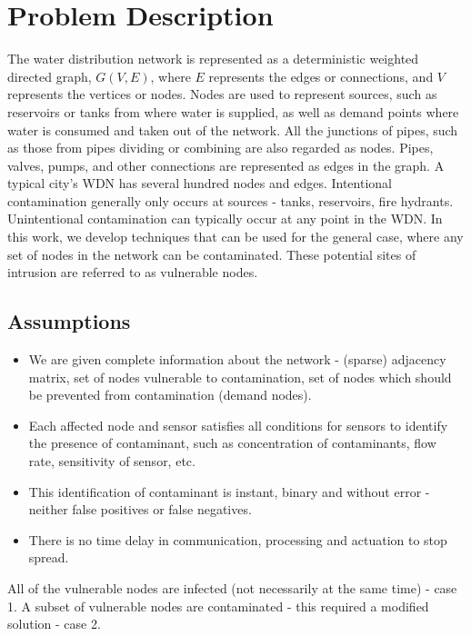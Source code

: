 \documentclass[authoryear,preprint,review,12pt]{elsarticle}
\begin{document}
\section{Problem Description}

The water distribution network is represented as a deterministic weighted directed graph,
$G(V,E)$, where $E$ represents the edges or connections, and $V$ represents the vertices or
nodes.
Nodes are used to represent sources, such as reservoirs or tanks from where water is supplied,
as well as demand points where water is consumed and taken out of the network.
All the junctions of pipes, such as those from pipes dividing or combining are also regarded as nodes.
Pipes, valves, pumps, and other connections are represented as edges in the graph.
A typical city's WDN has several hundred nodes and edges.
Intentional contamination generally only occurs at sources - tanks, reservoirs, fire hydrants.
Unintentional contamination can typically occur at any point in the WDN.
In this work, we develop techniques that can be used for the general case, where any set of nodes in the network can be contaminated.
These potential sites of intrusion are referred to as vulnerable nodes.

\subsection{Assumptions}
\begin{itemize}
    \item We are given complete information about the network - (sparse) adjacency matrix,
        set of nodes vulnerable to contamination,
        set of nodes which should be prevented from contamination (demand nodes).
    \item Each affected node and sensor satisfies all conditions for sensors to identify
        the presence of contaminant, such as concentration of contaminants, flow rate, sensitivity of sensor, etc.\\
    \item This identification of contaminant is instant, binary and without error - neither false positives or false negatives.
    \item There is no time delay in communication, processing and actuation to stop spread.
\end{itemize}
All of the vulnerable nodes are infected (not necessarily at the same time) - case 1.
A subset of vulnerable nodes are contaminated - this required a modified solution - case 2.
\end{document}
